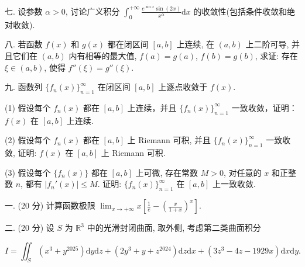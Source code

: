 \documentclass{examcollection}
\renewcommand{\displayformula}[1]{\[#1\]}
\begin{document}
{\begin{minipage}{\textwidth}
七. 设参数 $\alpha > 0$, 讨论广义积分 $\int_{0}^{+\infty} \frac{e^{\sin x} \sin(2x)}{x^{\alpha}} \mathrm{d}x$ 的收敛性(包括条件收敛和绝对收敛).\par
八. 若函数 $f(x)$ 和 $g(x)$ 都在闭区间 $[a, b]$ 上连续, 在 $(a, b)$ 上二阶可导, 并且它们在 $(a, b)$ 内有相等的最大值, $f(a) = g(a)$, $f(b) = g(b)$, 求证: 存在 $\xi \in (a, b)$, 使得 $f''(\xi) = g''(\xi)$.\par
九. 函数列 $\{f_n(x)\}_{n=1}^{\infty}$ 在闭区间 $[a, b]$ 上逐点收敛于 $f(x)$.\par
(1) 假设每个 $f_{n}(x)$ 都在 $[a, b]$ 上连续，并且 $\{f_{n}(x)\}_{n=1}^{\infty}$ 一致收敛，证明：$f(x)$ 在 $[a, b]$ 上连续.\par
(2) 假设每个 $f_{n}(x)$ 都在 $[a, b]$ 上 Riemann 可积, 并且 $\{f_{n}(x)\}_{n=1}^{\infty}$ 一致收敛, 证明: $f(x)$ 在 $[a, b]$ 上 Riemann 可积.\par
(3) 假设每个 $\{f_n(x)\}$ 都在 $[a, b]$ 上可微, 存在常数 $M > 0$, 对任意的 $x$ 和正整数 $n$, 都有 $|f_n'(x)| \leq M$. 证明: $\{f_n(x)\}_{n=1}^{\infty}$ 在 $[a, b]$ 上一致收敛.\par
{}\smallskip
一. (20 分) 计算函数极限 $\lim_{x \to +\infty} x \left[ \frac{1}{e} - \left( \frac{x}{1 + x} \right)^x \right]$.\par
二. (20 分) 设 $S$ 为 $\mathbb{R}^3$ 中的光滑封闭曲面, 取外侧, 考虑第二类曲面积分\par
\displayformula{I = \iint_ {S} \left(x ^ {3} + y ^ {2025}\right) \mathrm{d} y \mathrm{d} z + \left(2 y ^ {3} + y + z ^ {2024}\right) \mathrm{d} z \mathrm{d} x + \left(3 z ^ {3} - 4 z - 1929 x\right) \mathrm{d} x \mathrm{d} y.}\par
\end{minipage}}
\ifdim\dimexpr\ht\proofbox+\dp\proofbox\relax>\textheight
\noindent\resizebox{!}{\textheight}{\usebox{\proofbox}}\else\noindent\usebox{\proofbox}\fi\clearpage
\end{document}
